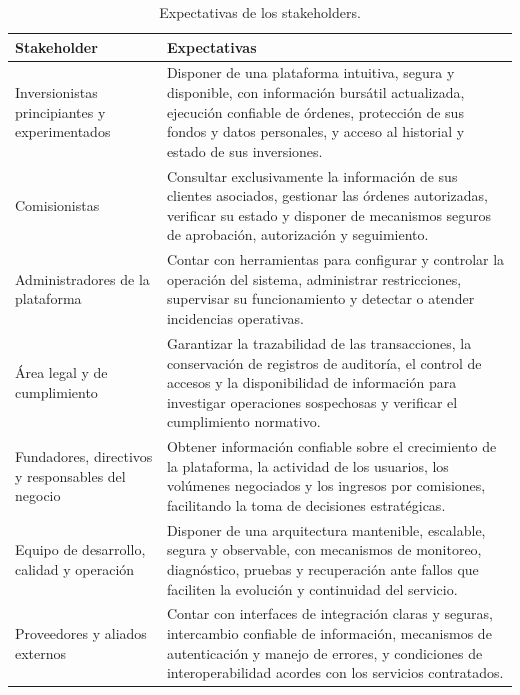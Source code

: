 \documentclass[11pt,a4paper,oneside]{article}
\newcommand{\separadorTabla}{\vspace{0.35cm}}
\begin{document}
\separadorTabla

\begin{table}[H]
\caption{Expectativas de los stakeholders.}
\begin{tabularx}{\textwidth}{|
>{\RaggedRight\arraybackslash}X|
>{\RaggedRight\arraybackslash}X|}\hline

\rowcolor{negroTabla}
\centering\color{white}\bfseries Stakeholder &
\centering\arraybackslash\color{white}\bfseries Expectativas
\\\hline

Inversionistas principiantes y experimentados &
Disponer de una plataforma intuitiva, segura y disponible,
con información bursátil actualizada, ejecución confiable
de órdenes, protección de sus fondos y datos personales,
y acceso al historial y estado de sus inversiones.
\\\hline

Comisionistas &
Consultar exclusivamente la información de sus clientes
asociados, gestionar las órdenes autorizadas, verificar
su estado y disponer de mecanismos seguros de aprobación,
autorización y seguimiento.
\\\hline

Administradores de la plataforma &
Contar con herramientas para configurar y controlar
la operación del sistema, administrar restricciones,
supervisar su funcionamiento y detectar o atender
incidencias operativas.
\\\hline

Área legal y de cumplimiento &
Garantizar la trazabilidad de las transacciones,
la conservación de registros de auditoría, el control
de accesos y la disponibilidad de información para
investigar operaciones sospechosas y verificar el
cumplimiento normativo.
\\\hline

Fundadores, directivos y responsables del negocio &
Obtener información confiable sobre el crecimiento
de la plataforma, la actividad de los usuarios,
los volúmenes negociados y los ingresos por comisiones,
facilitando la toma de decisiones estratégicas.
\\\hline

Equipo de desarrollo, calidad y operación &
Disponer de una arquitectura mantenible, escalable,
segura y observable, con mecanismos de monitoreo,
diagnóstico, pruebas y recuperación ante fallos que
faciliten la evolución y continuidad del servicio.
\\\hline

Proveedores y aliados externos &
Contar con interfaces de integración claras y seguras,
intercambio confiable de información, mecanismos de
autenticación y manejo de errores, y condiciones de
interoperabilidad acordes con los servicios contratados.
\\\hline

\end{tabularx}
\end{table}
\end{document}
